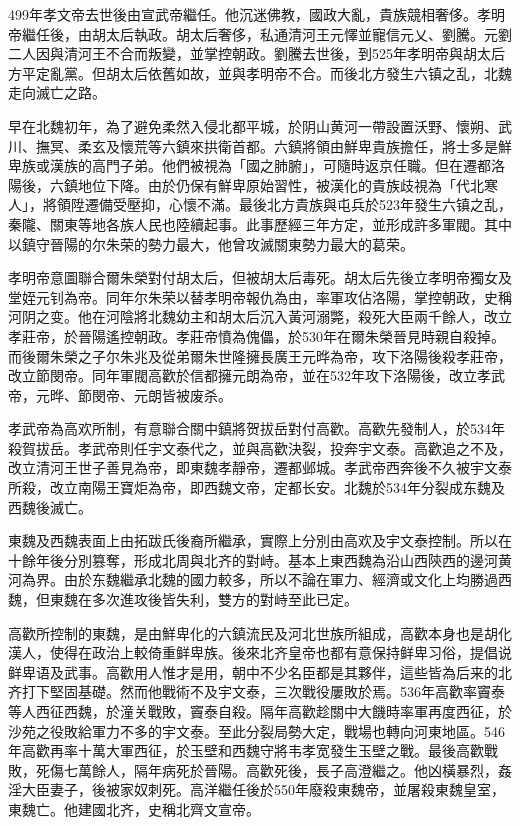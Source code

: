499年孝文帝去世後由宣武帝繼任。他沉迷佛教，國政大亂，貴族競相奢侈。孝明帝繼任後，由胡太后執政。胡太后奢侈，私通清河王元懌並寵信元乂、劉騰。元劉二人因與清河王不合而叛變，並掌控朝政。劉騰去世後，到525年孝明帝與胡太后方平定亂黨。但胡太后依舊如故，並與孝明帝不合。而後北方發生六镇之乱，北魏走向滅亡之路。

早在北魏初年，為了避免柔然入侵北都平城，於阴山黄河一帶設置沃野、懷朔、武川、撫冥、柔玄及懷荒等六鎮來拱衛首都。六鎮將領由鮮卑貴族擔任，將士多是鮮卑族或漢族的高門子弟。他們被視為「國之肺腑」，可隨時返京任職。但在遷都洛陽後，六鎮地位下降。由於仍保有鮮卑原始習性，被漢化的貴族歧視為「代北寒人」，將領陞遷備受壓抑，心懷不滿。最後北方貴族與屯兵於523年發生六镇之乱，秦隴、關東等地各族人民也陸續起事。此事歷經三年方定，並形成許多軍閥。其中以鎮守晉陽的尔朱荣的勢力最大，他曾攻滅關東勢力最大的葛荣。

孝明帝意圖聯合爾朱榮對付胡太后，但被胡太后毒死。胡太后先後立孝明帝獨女及堂姪元钊為帝。同年尔朱荣以替孝明帝報仇為由，率軍攻佔洛陽，掌控朝政，史稱河阴之变。他在河陰將北魏幼主和胡太后沉入黃河溺斃，殺死大臣兩千餘人，改立孝莊帝，於晉陽遙控朝政。孝莊帝憤為傀儡，於530年在爾朱榮晉見時親自殺掉。而後爾朱榮之子尔朱兆及從弟爾朱世隆擁長廣王元晔為帝，攻下洛陽後殺孝莊帝，改立節閔帝。同年軍閥高歡於信都擁元朗為帝，並在532年攻下洛陽後，改立孝武帝，元晔、節閔帝、元朗皆被废杀。

孝武帝為高欢所制，有意聯合關中鎮將贺拔岳對付高歡。高歡先發制人，於534年殺賀拔岳。孝武帝則任宇文泰代之，並與高歡決裂，投奔宇文泰。高歡追之不及，改立清河王世子善見為帝，即東魏孝靜帝，遷都邺城。孝武帝西奔後不久被宇文泰所殺，改立南陽王寶炬為帝，即西魏文帝，定都长安。北魏於534年分裂成东魏及西魏後滅亡。

東魏及西魏表面上由拓跋氏後裔所繼承，實際上分別由高欢及宇文泰控制。所以在十餘年後分別篡奪，形成北周與北齐的對峙。基本上東西魏為沿山西陝西的邊河黄河為界。由於东魏繼承北魏的國力較多，所以不論在軍力、經濟或文化上均勝過西魏，但東魏在多次進攻後皆失利，雙方的對峙至此已定。

高歡所控制的東魏，是由鮮卑化的六鎮流民及河北世族所組成，高歡本身也是胡化漢人，使得在政治上較倚重鲜卑族。後來北齐皇帝也都有意保持鲜卑习俗，提倡说鲜卑语及武事。高歡用人惟才是用，朝中不少名臣都是其夥伴，這些皆為后来的北齐打下堅固基礎。然而他戰術不及宇文泰，三次戰役屢敗於焉。536年高歡率竇泰等人西征西魏，於潼关戰敗，竇泰自殺。隔年高歡趁關中大饑時率軍再度西征，於沙苑之役敗給軍力不多的宇文泰。至此分裂局勢大定，戰場也轉向河東地區。546年高歡再率十萬大軍西征，於玉壁和西魏守將韦孝宽發生玉壁之戰。最後高歡戰敗，死傷七萬餘人，隔年病死於晉陽。高歡死後，長子高澄繼之。他凶橫暴烈，姦淫大臣妻子，後被家奴刺死。高洋繼任後於550年廢殺東魏帝，並屠殺東魏皇室，東魏亡。他建國北齐，史稱北齊文宣帝。

